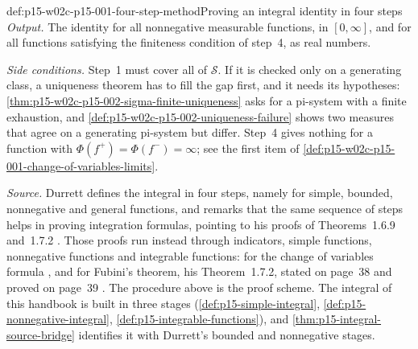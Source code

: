 \begin{hbmethod}{def:p15-w02c-p15-001-four-step-method}{Proving an integral identity in four steps}
\emph{Output.} The identity for all nonnegative measurable functions,
in \([0,\infty]\), and for all functions satisfying the finiteness
condition of step~4, as real numbers.

\emph{Side conditions.} Step~1 must cover all of \(\mathcal S\). If it
is checked only on a generating class, a uniqueness theorem has to fill
the gap first, and it needs its hypotheses:
\cref{thm:p15-w02c-p15-002-sigma-finite-uniqueness} asks for a pi-system
with a finite exhaustion, and \cref{def:p15-w02c-p15-002-uniqueness-failure}
shows two measures that agree on a generating pi-system but differ. Step~4
gives nothing for a function with \(\Phi(f^+)=\Phi(f^-)=\infty\); see the
first item of \cref{def:p15-w02c-p15-001-change-of-variables-limits}.

\emph{Source.} Durrett defines the integral in four steps, namely for
simple, bounded, nonnegative and general functions, and remarks that the
same sequence of steps helps in proving integration formulas, pointing to
his proofs of Theorems~1.6.9 and~1.7.2
\cite[sec.~1.4, p.~18]{DurrettPTEAuthor2019}. Those proofs run instead
through indicators, simple functions, nonnegative functions and
integrable functions: for the change of variables formula
\cite[pp.~32--33]{DurrettPTEAuthor2019}, and for Fubini's theorem, his
Theorem~1.7.2, stated on page~38 and proved on page~39
\cite[thm.~1.7.2, pp.~38--39]{DurrettPTEAuthor2019}.
The procedure above is the proof scheme. The integral of this handbook is
built in three stages (\cref{def:p15-simple-integral},
\cref{def:p15-nonnegative-integral}, \cref{def:p15-integrable-functions}),
and \cref{thm:p15-integral-source-bridge} identifies it with Durrett's
bounded and nonnegative stages.
\end{hbmethod}

